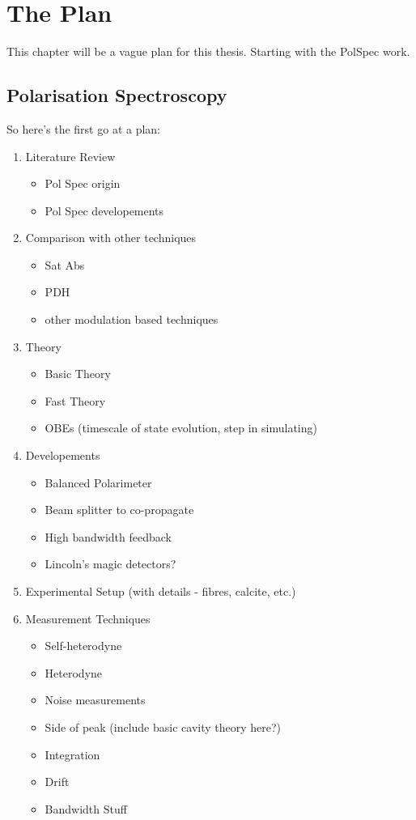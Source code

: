 \chapter{The Plan}
This chapter will be a vague plan for this thesis. Starting with the PolSpec work.

\section{Polarisation Spectroscopy}
So here's the first go at a plan:
\begin{enumerate}
    \item Literature Review
    \begin{itemize}
        \item Pol Spec origin
        \item Pol Spec developements
    \end{itemize}
    \item Comparison with other techniques
    \begin{itemize}
        \item Sat Abs
        \item PDH
        \item other modulation based techniques
    \end{itemize}
    \item Theory
    \begin{itemize}
        \item Basic Theory
        \item Fast Theory
        \item OBEs (timescale of state evolution, step in simulating)
    \end{itemize}
    \item Developements
    \begin{itemize}
        \item Balanced Polarimeter
        \item Beam splitter to co-propagate
        \item High bandwidth feedback
        \item Lincoln's magic detectors?
    \end{itemize}
    \item Experimental Setup (with details - fibres, calcite, etc.)
    \item Measurement Techniques
    \begin{itemize}
        \item Self-heterodyne
        \item Heterodyne
        \item Noise measurements
        \item Side of peak (include basic cavity theory here?)
        \item Integration
        \item Drift
        \item Bandwidth Stuff
    \end{itemize}
\end{enumerate}